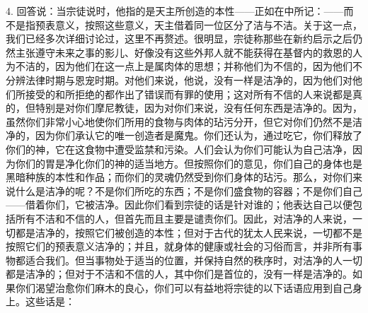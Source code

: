 4. 回答说：当宗徒说时，他指的是天主所创造的本性——正如在中所记：——而不是指预表意义，按照这些意义，天主借着同一位区分了洁与不洁。关于这一点，我们已经多次详细讨论过，这里不再赘述。很明显，宗徒称那些在新约启示之后仍然主张遵守未来之事的影儿、好像没有这些外邦人就不能获得在基督内的救恩的人为不洁的，因为他们在这一点上是属肉体的思想；并称他们为不信的，因为他们不分辨法律时期与恩宠时期。对他们来说，他说，没有一样是洁净的，因为他们对他们所接受的和所拒绝的都作出了错误而有罪的使用；这对所有不信的人来说都是真的，但特别是对你们摩尼教徒，因为对你们来说，没有任何东西是洁净的。因为，虽然你们非常小心地使你们所用的食物与肉体的玷污分开，但它对你们仍然不是洁净的，因为你们承认它的唯一创造者是魔鬼。你们还认为，通过吃它，你们释放了你们的神，它在这食物中遭受监禁和污染。人们会认为你们可能认为自己洁净，因为你们的胃是净化你们的神的适当地方。但按照你们的意见，你们自己的身体也是黑暗种族的本性和作品；而你们的灵魂仍然受到你们身体的玷污。那么，对你们来说什么是洁净的呢？不是你们所吃的东西；不是你们盛食物的容器；不是你们自己——借着你们，它被洁净。因此你们看到宗徒的话是针对谁的；他表达自己以便包括所有不洁和不信的人，但首先而且主要是谴责你们。因此，对洁净的人来说，一切都是洁净的，按照它们被创造的本性；但对于古代的犹太人民来说，一切都不是按照它们的预表意义洁净的；并且，就身体的健康或社会的习俗而言，并非所有事物都适合我们。但当事物处于适当的位置，并保持自然的秩序时，对洁净的人一切都是洁净的；但对于不洁和不信的人，其中你们是首位的，没有一样是洁净的。如果你们渴望治愈你们麻木的良心，你们可以有益地将宗徒的以下话语应用到自己身上。这些话是：\par



\section{}

\par

